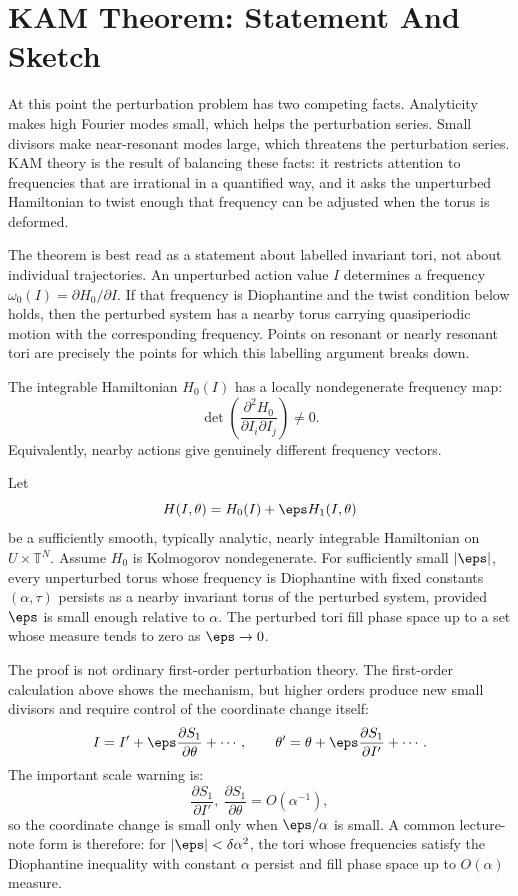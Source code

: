 \section{KAM Theorem: Statement And Sketch}
\label{sec:kam-theorem-sketch}

At this point the perturbation problem has two competing facts. Analyticity
makes high Fourier modes small, which helps the perturbation series. Small
divisors make near-resonant modes large, which threatens the perturbation
series. KAM theory is the result of balancing these facts: it restricts
attention to frequencies that are irrational in a quantified way, and it asks
the unperturbed Hamiltonian to twist enough that frequency can be adjusted when
the torus is deformed.

The theorem is best read as a statement about labelled invariant tori, not
about individual trajectories. An unperturbed action value \(I\) determines a
frequency \(\omega_0(I)=\partial H_0/\partial I\). If that frequency is
Diophantine and the twist condition below holds, then the perturbed system has
a nearby torus carrying quasiperiodic motion with the corresponding frequency.
Points on resonant or nearly resonant tori are precisely the points for which
this labelling argument breaks down.

\begin{assumption}
The integrable Hamiltonian \(H_0(I)\) has a locally nondegenerate frequency map:
\[
  \det\left(\frac{\partial^2H_0}{\partial I_i\partial I_j}\right)\neq0.
\]
Equivalently, nearby actions give genuinely different frequency vectors.
\end{assumption}

\begin{proposition}
Let
\[
  H(I,\theta)=H_0(I)+\eps H_1(I,\theta)
\]
be a sufficiently smooth, typically analytic, nearly integrable Hamiltonian on
\(U\times\mathbb T^N\). Assume \(H_0\) is Kolmogorov nondegenerate. For
sufficiently small \(|\eps|\), every unperturbed torus whose frequency is
Diophantine with fixed constants \((\alpha,\tau)\) persists as a nearby
invariant torus of the perturbed system, provided \(\eps\) is small enough
relative to \(\alpha\). The perturbed tori fill phase space up to a set whose
measure tends to zero as \(\eps\to0\).
\end{proposition}

The proof is not ordinary first-order perturbation theory. The first-order
calculation above shows the mechanism, but higher orders produce new small
divisors and require control of the coordinate change itself:
\[
  I=I'+\eps\frac{\partial S_1}{\partial\theta}+\cdots,
  \qquad
  \theta'=\theta+\eps\frac{\partial S_1}{\partial I'}+\cdots.
\]
The important scale warning is:
\[
  \frac{\partial S_1}{\partial I'},\
  \frac{\partial S_1}{\partial \theta}
  =
  O(\alpha^{-1}),
\]
so the coordinate change is small only when \(\eps/\alpha\) is small. A common
lecture-note form is therefore: for \(|\eps|<\delta\alpha^2\), the tori whose
frequencies satisfy the Diophantine inequality with constant \(\alpha\) persist
and fill phase space up to \(O(\alpha)\) measure.


